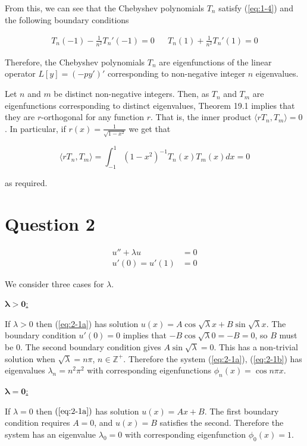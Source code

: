 \documentclass{article}
\begin{document}
From this, we can see that the Chebyshev polynomials $T_n$ satisfy (\ref{eq:1-4}) and the
following boundary conditions

\begin{align} \label{eq:1-6}
    T_n(-1) - \frac{1}{n^2}T_n'(-1) = 0 && T_n(1) + \frac{1}{n^2}T_n'(1) = 0
\end{align}

Therefore, the Chebyshev polynomials $T_n$ are eigenfunctions of the linear operator
$L[y] = (-py')'$ corresponding to non-negative integer $n$ eigenvalues.

\hfill\break
Let $n$ and $m$ be distinct non-negative integers. Then, as $T_n$ and $T_m$
are eigenfunctions corresponding to distinct eigenvalues, Theorem 19.1 implies
that they are $r$-orthogonal for any function $r$. That is, the inner product
$\langle rT_n, T_m \rangle = 0$. In particular, if $r(x) = \frac{1}{\sqrt{1 - x^2}}$
we get that

\begin{equation*}
    \langle rT_n, T_m \rangle = \int_{-1}^{1}(1 - x^2)^{-1}T_n(x)T_m(x) dx = 0
\end{equation*}

as required.

\section*{Question 2}

\begin{align} 
    u'' + \lambda u &= 0 \label{eq:2-1a}\\
    u'(0) = u'(1) &= 0 \label{eq:2-1b}
\end{align}

We consider three cases for $\lambda$.

\hfill\break
\underline{$\bm{\lambda > 0}$:}

If $\lambda > 0$ then (\ref{eq:2-1a}) has solution
$u(x) = A\cos\sqrt\lambda x + B\sin\sqrt\lambda x$. The boundary condition
$u'(0) = 0$ implies that $-B\cos\sqrt\lambda 0 = -B = 0$, so $B$ must be 0.
The second boundary condition gives $A\sin\sqrt\lambda = 0$. This has a
non-trivial solution when $\sqrt\lambda = n\pi$, $n \in \mathbb{Z}^+$.
Therefore the system (\ref{eq:2-1a}), (\ref{eq:2-1b}) has eigenvalues
$\lambda_n = n^2\pi^2$ with corresponding eigenfunctions
$\phi_n(x) = \cos n\pi x$.

\hfill\break
\underline{$\bm{\lambda = 0}$:}

If $\lambda = 0$ then $(\ref{eq:2-1a})$ has solution
$u(x) = Ax + B$. The first boundary condition requires $A = 0$,
and $u(x) = B$ satisfies the second. Therefore the system has an eigenvalue
$\lambda_0 = 0$ with corresponding eigenfunction $\phi_0(x) = 1$.
\end{document}
